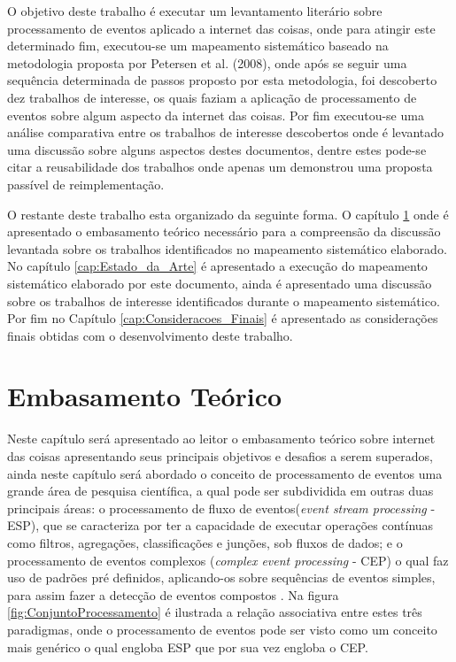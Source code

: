 \documentclass[ti,table]{texufpel} %
\begin{document}
O objetivo deste trabalho é executar um levantamento literário sobre processamento de eventos aplicado a internet das coisas, onde para atingir este determinado fim, executou-se um mapeamento sistemático baseado na metodologia proposta por Petersen et al. (2008), onde após se seguir uma sequência determinada de passos proposto por esta metodologia, foi descoberto dez trabalhos de interesse, os quais faziam a aplicação de processamento de eventos sobre algum aspecto da internet das coisas. Por fim executou-se uma análise comparativa entre os trabalhos de interesse descobertos onde é levantado uma discussão sobre alguns aspectos destes documentos, dentre estes pode-se citar a reusabilidade dos trabalhos onde apenas um demonstrou uma proposta passível de reimplementação. 


O restante deste trabalho esta organizado da seguinte forma. O capítulo \ref{cap:Embasamento_Teorico} onde é apresentado o embasamento teórico necessário para a compreensão da discussão levantada sobre os trabalhos identificados no mapeamento sistemático elaborado. No capítulo \ref{cap:Estado_da_Arte} é apresentado a execução do mapeamento sistemático elaborado por este documento, ainda é apresentado uma discussão sobre os trabalhos de interesse identificados durante o mapeamento sistemático. Por fim no Capítulo \ref{cap:Consideracoes_Finais} é apresentado as considerações finais obtidas com o desenvolvimento deste trabalho.




\chapter{Embasamento Teórico}
\label{cap:Embasamento_Teorico}

Neste capítulo será apresentado ao leitor o embasamento teórico sobre internet das coisas apresentando seus principais objetivos e desafios a serem superados, ainda neste capítulo será abordado o conceito de processamento de eventos uma grande área de pesquisa científica, a qual pode ser subdividida em outras duas principais áreas: o processamento de fluxo de eventos(\textit{event stream processing} - ESP), que se caracteriza por ter a capacidade de executar operações contínuas como filtros, agregações, classificações e junções, sob fluxos de dados; e o processamento de eventos complexos (\textit{complex event processing} - CEP) o qual faz uso de padrões pré definidos, aplicando-os sobre sequências de eventos simples, para assim fazer a detecção de eventos compostos \cite{dayarathna2018recent}. Na figura \ref{fig:ConjuntoProcessamento} é ilustrada a relação associativa entre estes três paradigmas, onde o processamento de eventos pode ser visto como um conceito mais genérico o qual engloba ESP que por sua vez engloba o CEP.
\end{document}
